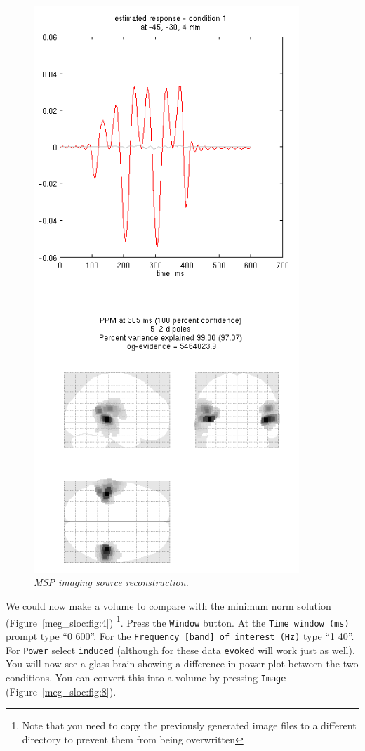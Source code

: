 \begin{figure}
\begin{center}
\includegraphics[width=100mm]{meg_sloc/slide7}
\caption{\em MSP imaging source reconstruction.\label{meg_sloc:fig:7}}
\end{center}
\end{figure}

We could now make a volume to compare with the minimum norm solution (Figure~\ref{meg_sloc:fig:4}) \footnote{Note that you need to copy the previously generated image files to a different directory to prevent them from being overwritten}. Press the \texttt{Window} button. At the \texttt{Time window (ms)} prompt type ``0 600''. For the \texttt{Frequency [band] of interest (Hz)} type ``1 40''. For \texttt{Power} select \texttt{induced} (although for these data \texttt{evoked} will work just as well). You will now see a glass brain showing a difference in power plot between the two conditions. You can convert this into a volume by pressing \texttt{Image} (Figure~\ref{meg_sloc:fig:8}).

